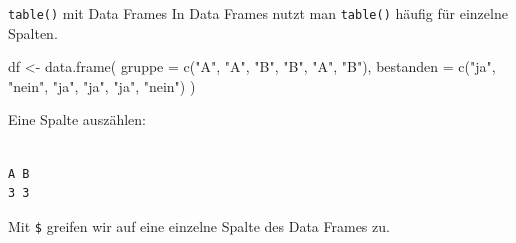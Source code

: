 \documentclass[
  10pt,
  ignorenonframetext,
  aspectratio=169,
]{beamer}
\newenvironment{Shaded}{}{}
\newcommand{\AttributeTok}[1]{\textcolor[rgb]{0.49,0.56,0.16}{#1}}
\newcommand{\FunctionTok}[1]{\textcolor[rgb]{0.02,0.16,0.49}{#1}}
\newcommand{\NormalTok}[1]{#1}
\newcommand{\OtherTok}[1]{\textcolor[rgb]{0.00,0.44,0.13}{#1}}
\newcommand{\SpecialCharTok}[1]{\textcolor[rgb]{0.25,0.44,0.63}{#1}}
\newcommand{\StringTok}[1]{\textcolor[rgb]{0.25,0.44,0.63}{#1}}
\begin{document}
\begin{frame}[fragile]{\texttt{table()} mit Data Frames}
\label{table-mit-data-frames}
In Data Frames nutzt man \texttt{table()} häufig für einzelne Spalten.

\begin{Shaded}
\begin{Highlighting}[]
\NormalTok{df }\OtherTok{\textless{}{-}} \FunctionTok{data.frame}\NormalTok{(}
  \AttributeTok{gruppe =} \FunctionTok{c}\NormalTok{(}\StringTok{"A"}\NormalTok{, }\StringTok{"A"}\NormalTok{, }\StringTok{"B"}\NormalTok{, }\StringTok{"B"}\NormalTok{, }\StringTok{"A"}\NormalTok{, }\StringTok{"B"}\NormalTok{),}
  \AttributeTok{bestanden =} \FunctionTok{c}\NormalTok{(}\StringTok{"ja"}\NormalTok{, }\StringTok{"nein"}\NormalTok{, }\StringTok{"ja"}\NormalTok{, }\StringTok{"ja"}\NormalTok{, }\StringTok{"ja"}\NormalTok{, }\StringTok{"nein"}\NormalTok{)}
\NormalTok{)}
\end{Highlighting}
\end{Shaded}

Eine Spalte auszählen:

\begin{Shaded}
\end{Shaded}

\begin{verbatim}

A B 
3 3 
\end{verbatim}

Mit \texttt{\$} greifen wir auf eine einzelne Spalte des Data Frames zu.
\end{frame}
\end{document}
